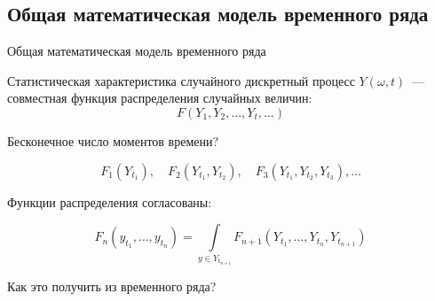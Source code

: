 \documentclass[10pt,pdf,utf8,hyperref={unicode},aspectratio=169]{beamer}
\begin{document}
\subsection{Общая математическая модель временного ряда}
\begin{frame}{Общая математическая модель временного ряда}{}

Статистическая характеристика случайного дискретный процесс $Y(\omega,t)$~--- совместная функция распределения случайных величин:
$$
	F(Y_1, Y_2, \ldots, Y_t, \ldots)
$$

\medskip
Бесконечное число моментов времени?

$$
	F_1 \left(Y_{t_1}\right), 
	\quad 
	F_2 \left(Y_{t_1}, Y_{t_2}\right),
	\quad
	F_3 \left(Y_{t_1}, Y_{t_2}, Y_{t_3}\right),
	\ldots
$$



Функции распределения  согласованы:


$$
	F_n(y_{t_1}, \ldots, y_{t_n}) = 
	\int\limits_{y \in Y_{t_{n+1}}} F_{n+1}(Y_{t_1}, \ldots, Y_{t_n}, Y_{t_{n+1}})
$$

Как это получить из временного ряда?



\end{frame}
\end{document}
